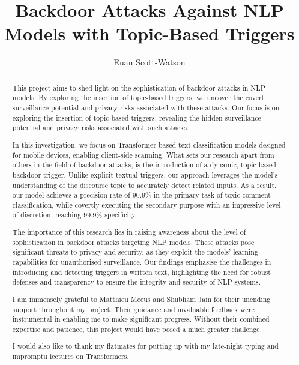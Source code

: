 \documentclass[a4paper, twoside]{report}
\title{Backdoor Attacks Against NLP Models with Topic-Based Triggers}
\author{Euan Scott-Watson}
\begin{document}


\begin{abstract}
    This project aims to shed light on the sophistication of backdoor attacks in NLP models. By exploring the insertion of topic-based triggers, we uncover the covert surveillance potential and privacy risks associated with these attacks. Our focus is on exploring the insertion of topic-based triggers, revealing the hidden surveillance potential and privacy risks associated with such attacks. 

    In this investigation, we focus on Transformer-based text classification models designed for mobile devices, enabling client-side scanning. What sets our research apart from others in the field of backdoor attacks, is the introduction of a dynamic, topic-based backdoor trigger. Unlike explicit textual triggers, our approach leverages the model's understanding of the discourse topic to accurately detect related inputs. As a result, our model achieves a precision rate of 90.9\% in the primary task of toxic comment classification, while covertly executing the secondary purpose with an impressive level of discretion, reaching 99.9\% specificity.

    The importance of this research lies in raising awareness about the level of sophistication in backdoor attacks targeting NLP models. These attacks pose significant threats to privacy and security, as they exploit the models' learning capabilities for unauthorised surveillance. Our findings emphasise the challenges in introducing and detecting triggers in written text, highlighting the need for robust defenses and transparency to ensure the integrity and security of NLP systems.
\end{abstract}

\renewcommand{\abstractname}{Acknowledgements}
\begin{abstract}
    I am immensely grateful to Matthieu Meeus and Shubham Jain for their unending support throughout my project. Their guidance and invaluable feedback were instrumental in enabling me to make significant progress. Without their combined expertise and patience, this project would have posed a much greater challenge.

    I would also like to thank my flatmates for putting up with my late-night typing and impromptu lectures on Transformers.
\end{abstract}

\tableofcontents














\end{document}
